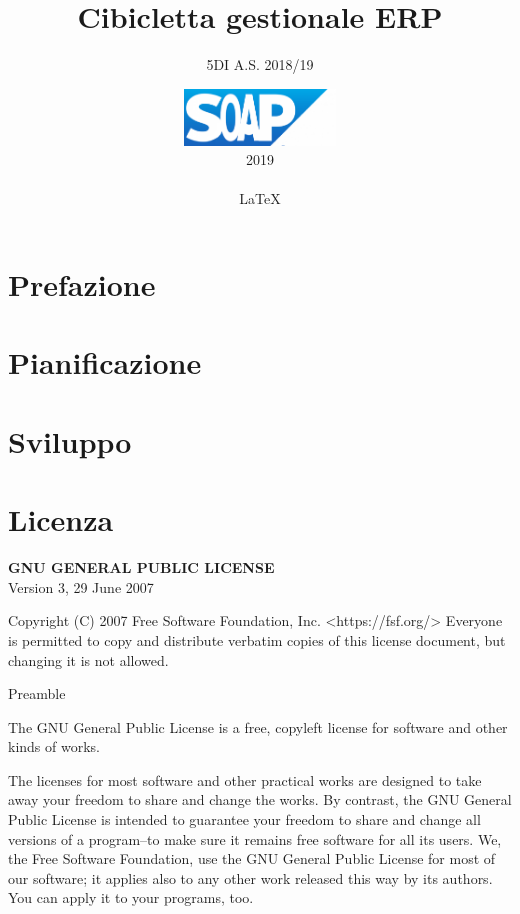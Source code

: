 \documentclass[11pt]{book}
\title{Cibicletta gestionale ERP}
\author{5DI A.S. 2018/19}
\date{
\includegraphics[width=0.3\textwidth]{logo.png}\\
2019 \\\\ \LaTeX
}
\begin{document}
    \pagestyle{empty}
    \maketitle
    \tableofcontents

    \chapter*{Prefazione}

    

    \addtocounter{page}{2}

    \chapter{Pianificazione}\label{ch:docs}

    

    \chapter{Sviluppo}\label{ch:sviluppo}

    

    \chapter{Licenza}\label{ch:licenza}
    \begin{center}
        \textbf{GNU GENERAL PUBLIC LICENSE}\\
        Version 3, 29 June 2007\\
    \end{center}

    Copyright (C) 2007 Free Software Foundation, Inc. <https://fsf.org/>
    Everyone is permitted to copy and distribute verbatim copies
    of this license document, but changing it is not allowed.

    Preamble

    The GNU General Public License is a free, copyleft license for
    software and other kinds of works.

    The licenses for most software and other practical works are designed
    to take away your freedom to share and change the works.  By contrast,
    the GNU General Public License is intended to guarantee your freedom to
    share and change all versions of a program--to make sure it remains free
    software for all its users.  We, the Free Software Foundation, use the
    GNU General Public License for most of our software; it applies also to
    any other work released this way by its authors.  You can apply it to
    your programs, too.
\end{document}
